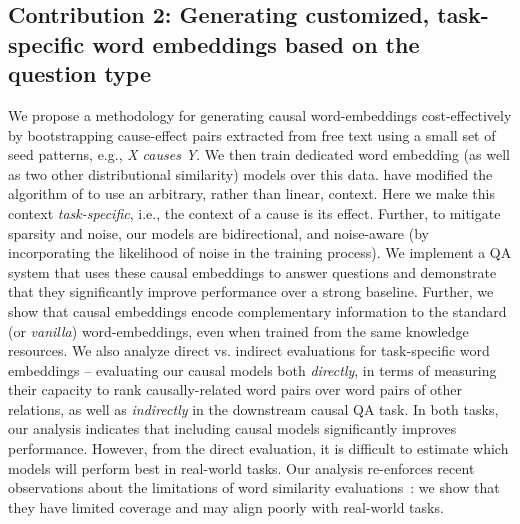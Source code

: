 \subsection{Contribution 2: Generating customized, task-specific word embeddings based on the question type} We propose a methodology for generating causal word-embeddings cost-effectively by bootstrapping cause-effect pairs extracted from free text using a small set of seed patterns, e.g., {\em X causes Y}. 
We then train dedicated word embedding (as well as two other distributional similarity) models over this data. \citet{levy2014dependency} have modified the algorithm of\citet{mikolov2013distributed} to use an arbitrary, rather than linear, context. Here we make this context \emph{task-specific}, i.e., the context of a cause is its effect.
Further, to mitigate sparsity and noise, our models are bidirectional, and noise-aware (by incorporating the likelihood of noise in the training process). 
We implement a QA system that uses these causal embeddings to answer questions and demonstrate that they significantly improve performance over a strong baseline. Further, we show that causal embeddings encode complementary information to the standard (or \emph{vanilla}) word-embeddings, even when trained from the same knowledge resources. 
We also analyze direct vs. indirect evaluations for task-specific word embeddings -- evaluating our causal models both  {\em directly}, in terms of measuring their capacity to rank causally-related word pairs over word pairs of other relations, as well as {\em indirectly} in the downstream causal QA task. 
In both tasks, our analysis indicates that including causal models significantly improves performance. 
However, from the direct evaluation, it is difficult to estimate which models will perform best in real-world tasks. Our analysis re-enforces recent observations about the limitations of word similarity evaluations~\citep{faruqui2016problems}: we show that they have limited coverage and may align poorly with real-world tasks.

